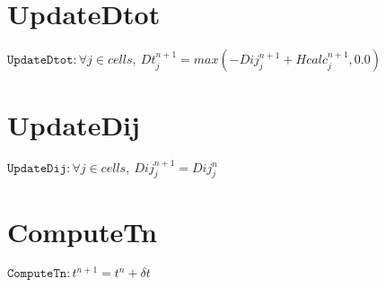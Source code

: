 \documentclass[11pt]{article}
\begin{document}
\section{UpdateDtot}
$\texttt{UpdateDtot} : \forall{j\in cells}, \ Dt^{n+1}_{j} = max\left(-Dij^{n+1}_{j} + Hcalc^{n+1}_{j},0.0\right)$


\section{UpdateDij}
$\texttt{UpdateDij} : \forall{j\in cells}, \ Dij^{n+1}_{j} = Dij^{n}_{j}$


\section{ComputeTn}
$\texttt{ComputeTn} : t^{n+1} = t^{n} + \delta t$
\end{document}

